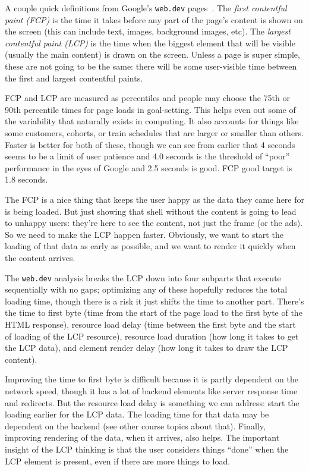A couple quick definitions from Google's \texttt{web.dev} pages~\cite{fcp, lcp}. The \textit{first contentful paint (FCP)} is the time it takes before any part of the page's content is shown on the screen (this can include text, images, background images, etc). The \textit{largest contentful paint (LCP)} is the time when the biggest element that will be visible (usually the main content) is drawn on the screen. Unless a page is super simple, these are not going to be the same: there will be some user-visible time between the first and largest contentful paints. 

FCP and LCP are measured as percentiles and people may choose the 75th or 90th percentile times for page loads in goal-setting. This helps even out some of the variability that naturally exists in computing. It also accounts for things like some customers, cohorts, or train schedules that are larger or smaller than others. Faster is better for both of these, though we can see from earlier that 4 seconds seems to be a limit of user patience and 4.0 seconds is the threshold of ``poor'' performance in the eyes of Google and 2.5 seconds is good. FCP good target is 1.8 seconds.

The FCP is a nice thing that keeps the user happy as the data they came here for is being loaded. But just showing that shell without the content is going to lead to unhappy users: they're here to see the content, not just the frame (or the ads). So we need to make the LCP happen faster. Obviously, we want to start the loading of that data as early as possible, and we want to render it quickly when the content arrives.

The \texttt{web.dev} analysis breaks the LCP down into four subparts that execute sequentially with no gaps; optimizing any of these hopefully reduces the total loading time, though there is a risk it just shifts the time to another part. There's the time to first byte (time from the start of the page load to the first byte of the HTML response), resource load delay (time between the first byte and the start of loading of the LCP resource), resource load duration (how long it takes to get the LCP data), and element render delay (how long it takes to draw the LCP content). 

Improving the time to first byte is difficult because it is partly dependent on the network speed, though it has a lot of backend elements like server response time and redirects. But the resource load delay is something we can address: start the loading earlier for the LCP data. The loading time for that data may be dependent on the backend (see other course topics about that). Finally, improving rendering of the data, when it arrives, also helps.  The important insight of the LCP thinking is that the user considers things ``done'' when the LCP element is present, even if there are more things to load. 

